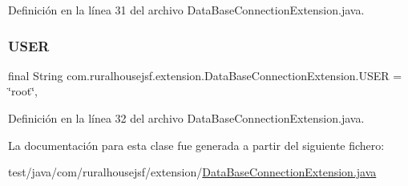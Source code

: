 Definición en la línea 31 del archivo Data\+Base\+Connection\+Extension.\+java.

\mbox{\label{classcom_1_1ruralhousejsf_1_1extension_1_1_data_base_connection_extension_a87696d6ea7d62869301b08d9264182b0}} 
\subsubsection{\texorpdfstring{USER}{USER}}
{\footnotesize\ttfamily final String com.\+ruralhousejsf.\+extension.\+Data\+Base\+Connection\+Extension.\+U\+S\+ER = \char`\"{}root\char`\"{}\hspace{0.3cm}{\ttfamily [static]}, {\ttfamily [private]}}



Definición en la línea 32 del archivo Data\+Base\+Connection\+Extension.\+java.



La documentación para esta clase fue generada a partir del siguiente fichero\+:\begin{DoxyCompactItemize}
\item 
test/java/com/ruralhousejsf/extension/\mbox{\hyperlink{_data_base_connection_extension_8java}{Data\+Base\+Connection\+Extension.\+java}}\end{DoxyCompactItemize}
